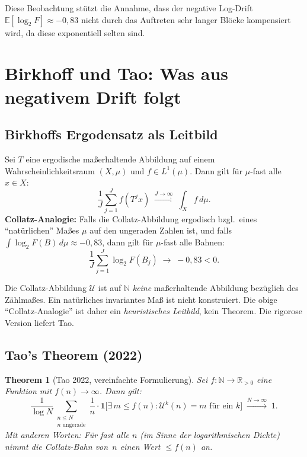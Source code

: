 \documentclass[12pt,a4paper]{article}
\newtheorem{theorem}[definition]{Theorem}
\newcommand{\U}{\mathcal{U}}
\newcommand{\N}{\mathbb{N}}
\newcommand{\R}{\mathbb{R}}
\newcommand{\E}{\mathbb{E}}
\newcommand{\logt}{\log_2}        %
\begin{document}
Diese Beobachtung stützt die Annahme, dass der negative Log-Drift
$\E[\logt F] \approx -0{,}83$ nicht durch das Auftreten sehr langer Blöcke
kompensiert wird, da diese exponentiell selten sind.

\section{Birkhoff und Tao: Was aus negativem Drift folgt}
\label{sec:tao}

\subsection{Birkhoffs Ergodensatz als Leitbild}

\begin{tcolorbox}[kernidee, title={Birkhoff-Ergodensatz (Leitbild)}]
Sei $T$ eine ergodische maßerhaltende Abbildung auf einem
Wahrscheinlichkeitsraum $(X, \mu)$ und $f \in L^1(\mu)$. Dann gilt
für $\mu$-fast alle $x \in X$:
\[
  \frac{1}{J}\sum_{j=1}^{J} f(T^j x) \;\xrightarrow{J\to\infty}\; \int_X f \, d\mu.
\]
\textbf{Collatz-Analogie:} Falls die Collatz-Abbildung ergodisch bzgl.\ eines
``natürlichen'' Maßes $\mu$ auf den ungeraden Zahlen ist, und falls
$\int \logt F(B)\, d\mu \approx -0{,}83$, dann gilt für $\mu$-fast alle
Bahnen:
\[
  \frac{1}{J}\sum_{j=1}^{J} \logt F(B_j) \;\to\; -0{,}83 < 0.
\]
\end{tcolorbox}

\begin{tcolorbox}[warnung, title={Was fehlt für die Anwendung von Birkhoff}]
Die Collatz-Abbildung $\U$ ist auf $\N$ \emph{keine} maßerhaltende Abbildung
bezüglich des Zählmaßes. Ein natürliches invariantes Maß ist nicht konstruiert.
Die obige ``Collatz-Analogie'' ist daher ein \emph{heuristisches Leitbild},
kein Theorem. Die rigorose Version liefert Tao.
\end{tcolorbox}

\subsection{Tao's Theorem (2022)}

\begin{theorem}[Tao 2022, vereinfachte Formulierung]
\label{thm:tao}
Sei $f\colon \N \to \R_{>0}$ eine Funktion mit $f(n) \to \infty$. Dann gilt:
\[
  \frac{1}{\log N}\sum_{\substack{n \leq N \\ n \text{ ungerade}}}
  \frac{1}{n} \cdot
  \mathbf{1}\!\bigl[\exists\,m \leq f(n)\colon \U^k(n) = m\text{ für ein }k\bigr]
  \;\xrightarrow{N\to\infty}\; 1.
\]
Mit anderen Worten: Für fast alle $n$ (im Sinne der logarithmischen Dichte)
nimmt die Collatz-Bahn von~$n$ einen Wert $\leq f(n)$ an.
\end{theorem}
\end{document}
